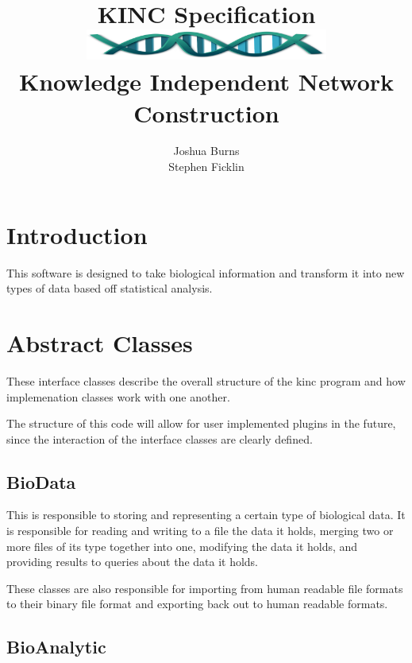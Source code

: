 \documentclass[10pt]{article}
\begin{document}
\title{\textbf{KINC Specification}\\
\vspace{1mm}
\includegraphics[width=12cm,height=1cm]{dna}
\\Knowledge Independent Network Construction}
\author{Joshua Burns\\Stephen Ficklin}
\maketitle

\tableofcontents

\newpage
\section{Introduction}

This software is designed to take biological information and transform it into 
new types of data based off statistical analysis.

\newpage
\section{Abstract Classes}

These interface classes describe the overall structure of the kinc program and 
how implemenation classes work with one another.

The structure of this code will allow for user implemented plugins in the 
future, since the interaction of the interface classes are clearly defined.

\subsection{BioData}

This is responsible to storing and representing a certain type of biological 
data. It is responsible for reading and writing to a file the data it holds, 
merging two or more files of its type together into one, modifying the data it 
holds, and providing results to queries about the data it holds.

These classes are also responsible for importing from human readable file 
formats to their binary file format and exporting back out to human readable 
formats.

\subsection{BioAnalytic}
\end{document}

